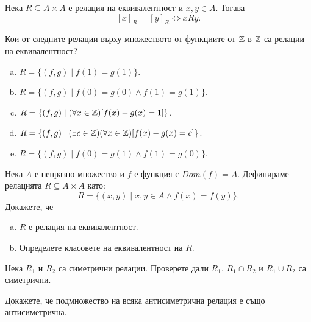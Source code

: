 \begin{lemma}
  Нека $R\subseteq A\times A$ е релация на еквивалентност и $x,y\in A$. 
  Тогава \[[x]_R = [y]_R \iff xRy.\]
\end{lemma}



\begin{problem}
  Кои от следните релации върху множеството от функциите от $\mathbb{Z}$ в $\mathbb{Z}$
  са релации на еквивалентност?
  \begin{enumerate}[a)]
  \item
    $R = \{(f,g)\mid f(1) = g(1)\}$.
  \item
    $R = \{(f,g)\mid f(0) = g(0)\wedge f(1) = g(1)\}$.
  \item
    $R =\{(f,g)\mid (\forall x\in\mathbb{Z})[f(x)-g(x) = 1]\}$.
  \item
    $R = \{(f,g)\mid (\exists c\in\mathbb{Z})(\forall x\in\mathbb{Z})[f(x)-g(x) = c]\}$.
  \item
    $R = \{(f,g)\mid f(0) = g(1)\wedge f(1) = g(0)\}$.
  \end{enumerate}
\end{problem}

\begin{problem}
  Нека $A$ е непразно множество и $f$ е функция с $Dom(f) = A$.
  Дефинираме релацията $R\subseteq A\times A$ като:
  \[R = \{(x,y)\mid x,y\in A\wedge f(x) = f(y)\}.\]
  Докажете, че
  \begin{enumerate}[a)]
  \item
    $R$ е релация на еквивалентност.
  \item
    Определете класовете на еквивалентност на $R$.
\end{enumerate}

\begin{problem}
  Нека $R_1$ и $R_2$ са симетрични релации.
  Проверете дали $\overline{R}_1$, $R_1\cap R_2$ и $R_1 \cup R_2$ са симетрични.
\end{problem}

\begin{problem}
  Докажете, че подмножество на всяка антисиметрична релация е също антисиметрична.
\end{problem}

\end{problem}




